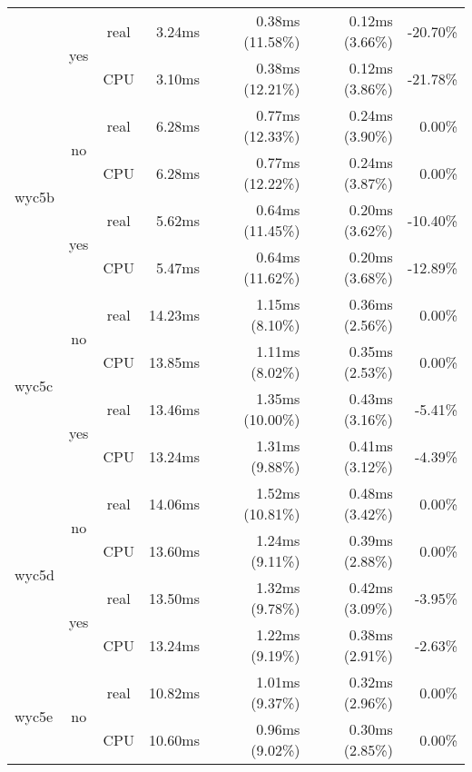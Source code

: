 \documentclass[en]{pracamgr}
\begin{document}
\begin{small}
\begin{longtable}{|l|c|c|r|r|r|r|}
                          \cline{2-7}
                          & \multirow{2}{*}{yes} & real & 3.24ms & 0.38ms (11.58\%) & 0.12ms (3.66\%) & -20.70\% \\*
                          &                      & CPU  & 3.10ms & 0.38ms (12.21\%) & 0.12ms (3.86\%) & -21.78\% \\
\hline
\multirow{4}{*}{wyc5b}    & \multirow{2}{*}{no}  & real & 6.28ms & 0.77ms (12.33\%) & 0.24ms (3.90\%) & 0.00\% \\*
                          &                      & CPU  & 6.28ms & 0.77ms (12.22\%) & 0.24ms (3.87\%) & 0.00\% \\*
                          \cline{2-7}
                          & \multirow{2}{*}{yes} & real & 5.62ms & 0.64ms (11.45\%) & 0.20ms (3.62\%) & -10.40\% \\*
                          &                      & CPU  & 5.47ms & 0.64ms (11.62\%) & 0.20ms (3.68\%) & -12.89\% \\
\hline
\multirow{4}{*}{wyc5c}    & \multirow{2}{*}{no}  & real & 14.23ms & 1.15ms (8.10\%) & 0.36ms (2.56\%) & 0.00\% \\*
                          &                      & CPU  & 13.85ms & 1.11ms (8.02\%) & 0.35ms (2.53\%) & 0.00\% \\*
                          \cline{2-7}
                          & \multirow{2}{*}{yes} & real & 13.46ms & 1.35ms (10.00\%) & 0.43ms (3.16\%) & -5.41\% \\*
                          &                      & CPU  & 13.24ms & 1.31ms (9.88\%) & 0.41ms (3.12\%) & -4.39\% \\
\hline
\multirow{4}{*}{wyc5d}    & \multirow{2}{*}{no}  & real & 14.06ms & 1.52ms (10.81\%) & 0.48ms (3.42\%) & 0.00\% \\*
                          &                      & CPU  & 13.60ms & 1.24ms (9.11\%) & 0.39ms (2.88\%) & 0.00\% \\*
                          \cline{2-7}
                          & \multirow{2}{*}{yes} & real & 13.50ms & 1.32ms (9.78\%) & 0.42ms (3.09\%) & -3.95\% \\*
                          &                      & CPU  & 13.24ms & 1.22ms (9.19\%) & 0.38ms (2.91\%) & -2.63\% \\
\hline
\multirow{4}{*}{wyc5e}    & \multirow{2}{*}{no}  & real & 10.82ms & 1.01ms (9.37\%) & 0.32ms (2.96\%) & 0.00\% \\*
                          &                      & CPU  & 10.60ms & 0.96ms (9.02\%) & 0.30ms (2.85\%) & 0.00\% \\*

\end{longtable}
\end{small}
\end{document}
